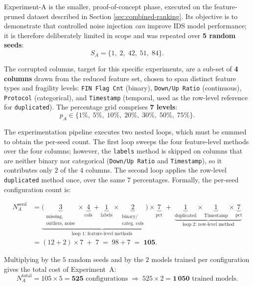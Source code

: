 \documentclass[../main.tex]{subfiles}
\begin{document}
Experiment-A is the smaller, proof-of-concept phase, executed on the feature-pruned dataset described in Section \ref{sec:combined-ranking}.  Its objective is to demonstrate that controlled noise injection \emph{can} improve IDS model performance; it is therefore deliberately limited in scope and was repeated over \textbf{5 random seeds}:
\[
    S_{A} = \{1,\; 2,\; 42,\; 51,\; 84\}.
\]

The corrupted columns, target for this specific experiments, are a sub-set of \textbf{4 columns} drawn from the reduced feature set, chosen to span distinct feature types and fragility levels: \texttt{FIN Flag Cnt} (binary), \texttt{Down/Up Ratio} (continuous), \texttt{Protocol} (categorical), and \texttt{Timestamp} (temporal, used as the row-level reference for \texttt{duplicated}).  The percentage grid comprises \textbf{7 levels}:
\[
    p_{A} \in \{1\%,\; 5\%,\; 10\%,\; 20\%,\; 30\%,\; 50\%,\; 75\%\}.
\]

The experimentation pipeline executes two nested loops, which must be summed to obtain the per-seed count.  The first loop sweeps the four feature-level methods over the four columns; however, the \texttt{labels} method is skipped on columns that are neither binary nor categorical (\texttt{Down/Up Ratio} and \texttt{Timestamp}), so it contributes only $2$ of the $4$ columns.  The second loop applies the row-level \texttt{duplicated} method once, over the same $7$ percentages.  Formally, the per-seed configuration count is:

\begin{align*}
N_{A}^{\text{seed}}
&= \underbrace{\bigl( \underbrace{3}_{\substack{\text{missing,}\\\text{outliers, noise}}} \times \underbrace{4}_{\text{cols}} + \underbrace{1}_{\text{labels}} \times \underbrace{2}_{\substack{\text{binary/}\\\text{categ.\ cols}}} \bigr) \times \underbrace{7}_{\text{pct}}}_{\text{loop 1: feature-level methods}}
   \;+\; \underbrace{\underbrace{1}_{\text{duplicated}} \times \underbrace{1}_{\text{Timestamp}} \times \underbrace{7}_{\text{pct}}}_{\text{loop 2: row-level method}} \\[4pt]
&= (12 + 2)\times 7 \;+\; 7
 \;=\; 98 + 7 \;=\; \mathbf{105}.
\end{align*}

Multiplying by the $5$ random seeds and by the $2$ models trained per configuration gives the total cost of Experiment~A:
\[
    N_{A}^{\text{total}} = 105 \times 5 = \mathbf{525} \text{ configurations} \;\Longrightarrow\; 525 \times 2 = \mathbf{1\,050} \text{ trained models}.
\]
\end{document}
